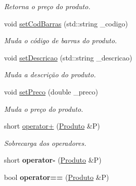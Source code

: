 \begin{DoxyCompactItemize}
\begin{DoxyCompactList}\small\item\em Retorna o preço do produto. \end{DoxyCompactList}\item 
void \hyperlink{classProduto_a8f8e7d58e53d3f175bc41b2481dbf477}{set\+Cod\+Barras} (std\+::string \+\_\+codigo)\hypertarget{classProduto_a8f8e7d58e53d3f175bc41b2481dbf477}{}\label{classProduto_a8f8e7d58e53d3f175bc41b2481dbf477}

\begin{DoxyCompactList}\small\item\em Muda o código de barras do produto. \end{DoxyCompactList}\item 
void \hyperlink{classProduto_a35b8ac377821ca2197becf75e1063509}{set\+Descricao} (std\+::string \+\_\+descricao)\hypertarget{classProduto_a35b8ac377821ca2197becf75e1063509}{}\label{classProduto_a35b8ac377821ca2197becf75e1063509}

\begin{DoxyCompactList}\small\item\em Muda a descrição do produto. \end{DoxyCompactList}\item 
void \hyperlink{classProduto_a207ec4b3438d376227ca3053a14669cf}{set\+Preco} (double \+\_\+preco)\hypertarget{classProduto_a207ec4b3438d376227ca3053a14669cf}{}\label{classProduto_a207ec4b3438d376227ca3053a14669cf}

\begin{DoxyCompactList}\small\item\em Muda o preço do produto. \end{DoxyCompactList}\item 
short \hyperlink{classProduto_acf7613fa36d11bc4d79bd1b6d485a5b1}{operator+} (\hyperlink{classProduto}{Produto} \&P)\hypertarget{classProduto_acf7613fa36d11bc4d79bd1b6d485a5b1}{}\label{classProduto_acf7613fa36d11bc4d79bd1b6d485a5b1}

\begin{DoxyCompactList}\small\item\em Sobrecarga dos operadores. \end{DoxyCompactList}\item 
short {\bfseries operator-\/} (\hyperlink{classProduto}{Produto} \&P)\hypertarget{classProduto_a87223f7a97c77f17b7226f0014a0de79}{}\label{classProduto_a87223f7a97c77f17b7226f0014a0de79}

\item 
bool {\bfseries operator==} (\hyperlink{classProduto}{Produto} \&P)\hypertarget{classProduto_af0836c18bc7b090a6a3410330e303ec3}{}\label{classProduto_af0836c18bc7b090a6a3410330e303ec3}

\end{DoxyCompactItemize}
